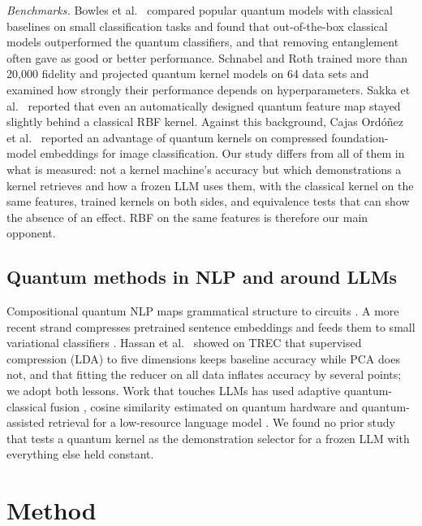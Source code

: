 \emph{Benchmarks.} Bowles et al.~\cite{bowles2024better} compared popular quantum models with classical
baselines on small classification tasks and found that out-of-the-box classical models outperformed the
quantum classifiers, and that removing entanglement often gave as good or better performance. Schnabel and
Roth \cite{schnabel2025scrutiny} trained more than 20{,}000 fidelity and projected quantum kernel models on
64 data sets and examined how strongly their performance depends on hyperparameters. Sakka et
al.~\cite{sakka2025automating} reported that even an automatically designed quantum feature map stayed
slightly behind a classical RBF kernel. Against this background, Cajas Ordóñez et
al.~\cite{cajas2026medical} reported an advantage of quantum kernels on compressed foundation-model
embeddings for image classification. Our study differs from all of them in what is measured: not a
kernel machine's accuracy but which demonstrations a kernel retrieves and how a frozen LLM uses them, with
the classical kernel on the same features, trained kernels on both sides, and equivalence tests that can
show the absence of an effect. RBF on the same features is therefore our main opponent.

\subsection{Quantum methods in NLP and around LLMs}
Compositional quantum NLP maps grammatical structure to circuits
\cite{lorenz2023qnlp,meichanetzidis2023grammar}. A more recent strand compresses
pretrained sentence embeddings and feeds them to small variational classifiers
\cite{pal2025hybrid,devanarayanan2025paraphrase}. Hassan et al.~\cite{hassan2026hybrid}
showed on TREC that supervised compression (LDA) to five dimensions keeps baseline accuracy while PCA
does not, and that fitting the reducer on all data inflates accuracy by several points; we adopt both
lessons. Work that touches LLMs has used adaptive quantum-classical fusion \cite{pan2025bridging}, cosine
similarity estimated on quantum hardware \cite{laine2025quantum} and quantum-assisted retrieval for a
low-resource language model \cite{singh2025quantumrag}. We found no prior study that tests a quantum kernel
as the demonstration selector for a frozen LLM with everything else held constant.

\section{Method}

